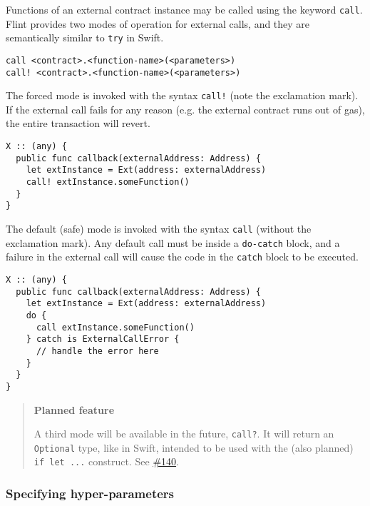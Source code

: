 Functions of an external contract instance may be called using the keyword \texttt{call}. Flint provides two modes of operation for external calls, and they are semantically similar to \texttt{try} in Swift.

\begin{verbatim}
call <contract>.<function-name>(<parameters>)
call! <contract>.<function-name>(<parameters>)
\end{verbatim}

The forced mode is invoked with the syntax \texttt{call!} (note the exclamation mark). If the external call fails for any reason (e.g. the external contract runs out of gas), the entire transaction will revert.

\begin{verbatim}
X :: (any) {
  public func callback(externalAddress: Address) {
    let extInstance = Ext(address: externalAddress)
    call! extInstance.someFunction()
  }
}
\end{verbatim}

The default (safe) mode is invoked with the syntax \texttt{call} (without the exclamation mark). Any default call must be inside a \texttt{do-catch} block, and a failure in the external call will cause the code in the \texttt{catch} block to be executed.

\begin{verbatim}
X :: (any) {
  public func callback(externalAddress: Address) {
    let extInstance = Ext(address: externalAddress)
    do {
      call extInstance.someFunction()
    } catch is ExternalCallError {
      // handle the error here
    }
  }
}
\end{verbatim}

\begin{quote}
\textbf{Planned feature}

A third mode will be available in the future, \texttt{call?}. It will return an \texttt{Optional} type, like in Swift, intended to be used with the (also planned) \texttt{if let ...} construct. See \href{https://github.com/flintrocks/flint/issues/140}{\#140}.
\end{quote}

\subsubsection{Specifying hyper-parameters}
\label{sec:appendix-b-specifying-hyper-parameters}

